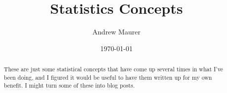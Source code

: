 \documentclass[12pt,draft,reqno]{amsart}
\begin{document}
\title{Statistics Concepts}
\author{Andrew Maurer}
\date{\today}

\begin{abstract}
  These are just some statistical concepts that have come up several times in what I've been doing, and I figured it would be useful to have them written up for my own benefit. I might turn some of these into blog posts.
\end{abstract}

\maketitle

\begin{center}
  \parbox{4.7in}{
    \tableofcontents
    }
\end{center}








\appendix

\vfill
\end{document}
